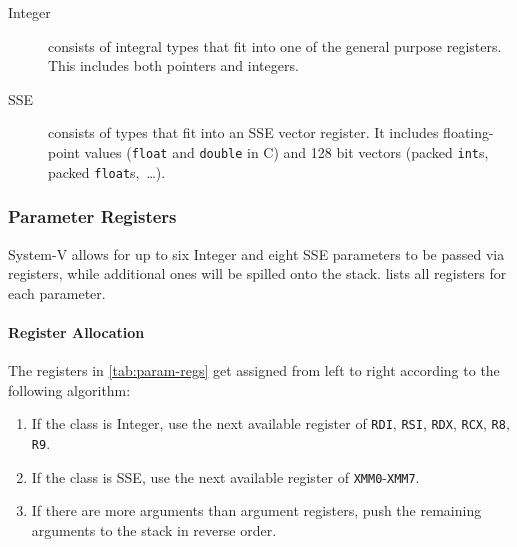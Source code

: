 \begin{description}
    \item[Integer] consists of integral types that fit into one of the general purpose registers.
    This includes both pointers and integers.
    \item[SSE] consists of types that fit into an SSE vector register.
    It includes floating-point values (\texttt{float} and \texttt{double} in C) and 128 bit vectors (packed \texttt{int}s, packed \texttt{float}s,~\dots).
\end{description}

\subsubsection{Parameter Registers}\label{subsubsec:parameter-registers}

System-V allows for up to six Integer and eight SSE parameters to be passed via registers, while additional ones will be spilled onto the stack.
 lists all registers for each parameter.

\paragraph{Register Allocation} The registers in \cref{tab:param-regs} get assigned from left to right according to the following algorithm:
\begin{enumerate}
    \item If the class is Integer, use the next available register of \texttt{RDI},
    \texttt{RSI}, \texttt{RDX}, \texttt{RCX}, \texttt{R8}, \texttt{R9}.
    \item If the class is SSE, use the next available register of \texttt{XMM0}-\texttt{XMM7}.
    \item If there are more arguments than argument registers, push the remaining arguments to the stack in reverse order.
\end{enumerate}


